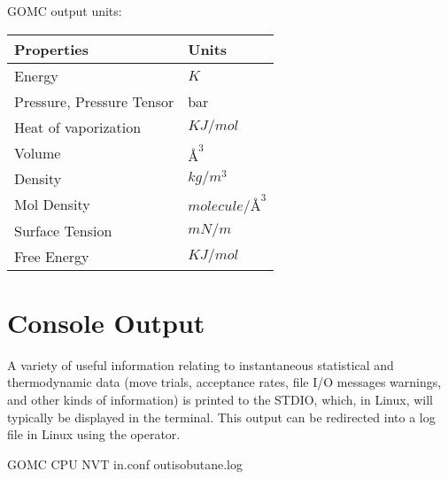 \documentclass[letterpaper,10pt,english]{sphinxmanual}
\begin{document}
GOMC output units:


\begin{savenotes}\sphinxattablestart
\centering
\begin{tabulary}{\linewidth}[t]{|T|T|}
\hline
\sphinxstyletheadfamily 
Properties
&\sphinxstyletheadfamily 
Units
\\
\hline
Energy
&
\(K\)
\\
\hline
Pressure, Pressure Tensor
&
bar
\\
\hline
Heat of vaporization
&
\(KJ/mol\)
\\
\hline
Volume
&
\(Å^3\)
\\
\hline
Density
&
\(kg/m^3\)
\\
\hline
Mol Density
&
\(molecule/Å^3\)
\\
\hline
Surface Tension
&
\(mN/m\)
\\
\hline
Free Energy
&
\(KJ/mol\)
\\
\hline
\end{tabulary}
\par
\sphinxattableend\end{savenotes}


\section{Console Output}
\label{\detokenize{output_file:console-output}}
A variety of useful information relating to instantaneous statistical and thermodynamic data (move trials, acceptance rates, file I/O messages warnings, and other kinds of information) is printed to the STDIO, which, in Linux, will typically be displayed in the terminal. This output can be redirected into a log file in Linux using the \sphinxcode{\sphinxupquote{\textgreater{}}} operator.

\begin{sphinxVerbatim}[commandchars=\\\{\}]
\PYGZdl{} GOMC CPU NVT in.conf \PYGZgt{} out\PYGZus{}isobutane.log 
\end{sphinxVerbatim}
\end{document}
